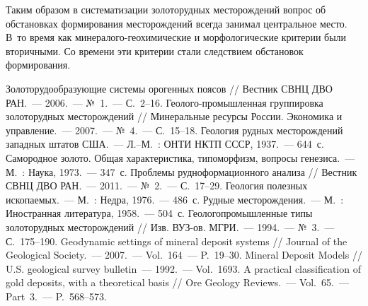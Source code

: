Таким образом в систематизации золоторудных месторождений вопрос об обстановках формирования месторождений всегда занимал центральное место. В~то время как минералого-геохимические и морфологические критерии были вторичными. Со времени эти критерии стали следствием обстановок формирования.

\begin{thebibliography}{99}
\bibitem{} Золоторудообразующие системы орогенных поясов // Вестник СВНЦ ДВО РАН.~--- 2006.~--- №~1.~--- С.~2--16.
\bibitem{} Геолого-промышленная группировка золоторудных месторождений // Минеральные ресурсы России. Экономика и управление.~--- 2007.~--- №~4.~--- С.~15--18.
\bibitem{} Геология рудных месторождений западных штатов США.~--- Л.--М.~: ОНТИ НКТП СССР, 1937.~--- 644~с.
\bibitem{} Самородное золото. Общая характеристика, типоморфизм, вопросы генезиса.~--- М.~: Наука, 1973.~--- 347~с.
\bibitem{} Проблемы рудноформационного анализа // Вестник СВНЦ ДВО РАН.~--- 2011.~--- №~2.~--- С.~17--29.
\bibitem{} Геология полезных ископаемых.~--- М.~: Недра, 1976.~--- 486~с.
\bibitem{} Рудные месторождения.~--- М.~: Иностранная литература, 1958.~--- 504~с.
\bibitem{} Геологопромышленные типы золоторудных месторождений // Изв. ВУЗ-ов. МГРИ.~--- 1994.~--- №~3.~--- С.~175--190.
\bibitem{} Geodynamic settings of mineral deposit systems // Journal of the Geological Society.~--- 2007.~--- Vol.~164~--- P.~19--30.
\bibitem{} Mineral Deposit Models // U.S. geological survey bulletin~--- 1992.~--- Vol.~1693.
\bibitem{} A practical classification of gold deposits, with a theoretical basis // Ore Geology Reviews.~--- Vol.~65.~--- Part~3.~--- P.~568--573.
\end{thebibliography}
\thispagestyle{empty}
